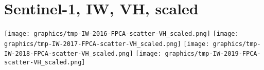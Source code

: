 
\section{Sentinel-1, IW, VH, scaled}
\setcounter{theorem}{0}

\renewcommand{\theenumi}{\roman{enumi}}
\renewcommand{\labelenumi}{\textnormal{(\theenumi)}$\;\;$}


\begin{center}
\begin{minipage}{7.0in}
\texttt{[image: graphics/tmp-IW-2016-FPCA-scatter-VH\_scaled.png]}
\quad
\texttt{[image: graphics/tmp-IW-2017-FPCA-scatter-VH\_scaled.png]}
\vskip 0.5cm
\texttt{[image: graphics/tmp-IW-2018-FPCA-scatter-VH\_scaled.png]}
\quad
\texttt{[image: graphics/tmp-IW-2019-FPCA-scatter-VH\_scaled.png]}
\end{minipage}
\end{center}


\renewcommand{\theenumi}{\roman{enumi}}
\renewcommand{\labelenumi}{\textnormal{(\theenumi)}$\;\;$}

